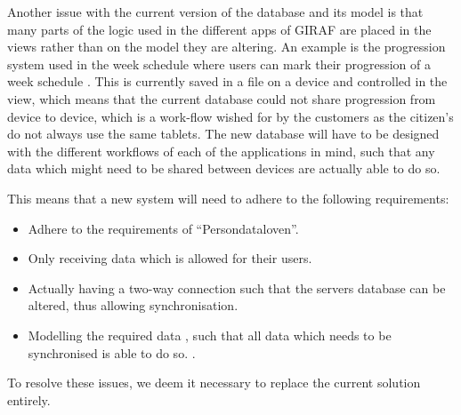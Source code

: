 Another issue with the current version of the database and its model is that many parts of the logic used in the different apps of GIRAF are placed in the views  rather than on the model they are altering. 
An example is the progression system  used in the week schedule where users can mark their progression of a week schedule . 
This is currently saved in a file on a device and controlled in the view, which means that the current database could not share progression from device to device, which is a work-flow wished for by the customers as the citizen's do not always use the same tablets.
The new database will have to be designed with the different workflows  of each of the applications in mind, such that any data which might need to be shared between devices are actually able to do so.

This means that a new system will need to adhere to the following requirements:
\begin{itemize}
	\item Adhere to the requirements of ``Persondataloven''. 
	\item Only receiving data which is allowed for their users. 
	\item Actually having a two-way connection such that the servers database can be altered, thus allowing synchronisation. 
	\item Modelling the required data , such that all data which needs to be synchronised is able to do so. .
\end{itemize}

To resolve these issues, we deem it necessary to replace the current solution entirely.

